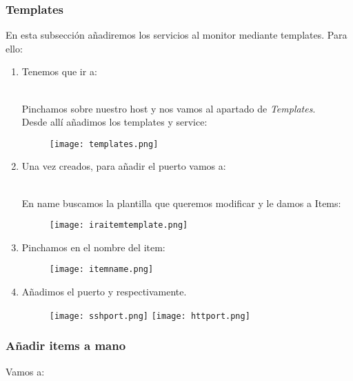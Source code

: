 \subsubsection{Templates}
En esta subsección añadiremos los servicios al monitor mediante templates. Para ello:
\begin{enumerate}
	\item Tenemos que ir a: \\
	\begin{minipage}{4cm}
	\end{minipage} \\
Pinchamos sobre nuestro host  y nos vamos al apartado de \textit{Templates}.
\\ Desde allí añadimos los templates  y  service:
\begin{figure}[H]
	\centering
	\texttt{[image: templates.png]} 
\end{figure}

	\item Una vez creados, para añadir el puerto vamos a: \\
	\begin{minipage}{10cm}
\end{minipage} \\
En name buscamos la plantilla que queremos modificar y le damos a Items:
\begin{figure}[H]
	\centering
	\texttt{[image: iraitemtemplate.png]} 
\end{figure}

	\item Pinchamos en el nombre del item:
\begin{figure}[H]
	\centering
	\texttt{[image: itemname.png]} 
\end{figure}

	\item Añadimos el puerto  y  respectivamente.

\begin{figure}[H]
	\centering
	\texttt{[image: sshport.png]} 
	\texttt{[image: httport.png]} 
\end{figure}
\end{enumerate}

\subsubsection{Añadir items a mano}
Vamos a: \\

